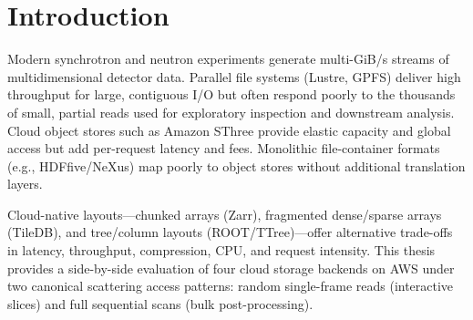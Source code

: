 \documentclass[nomenclature, english, bibtex]{kththesis}
\numberwithin{listing}{chapter}
\begin{document}
\renewcommand{\chaptermark}[1]{ \markboth{#1}{}}
\tableofcontents
 \markboth{\contentsname}{}

\cleardoublepage
\listoffigures

\cleardoublepage

\listoftables
\cleardoublepage
\cleardoublepage


\printglossary[style=mylong, type=\acronymtype, title={List of acronyms and abbreviations}]

\ifnomenclature
  \cleardoublepage
  \printnomenclature
\fi

\label{pg:lastPageofPreface}

\mainmatter
\glsresetall
\renewcommand{\chaptermark}[1]{\markboth{#1}{}}











\chapter{Introduction}
\label{ch:introduction}
Modern synchrotron and neutron experiments generate multi-GiB/s streams of multidimensional detector data. Parallel file systems (Lustre, \gls{GPFS}) deliver high throughput for large, contiguous I/O but often respond poorly to the thousands of small, partial reads used for exploratory inspection and downstream analysis. Cloud object stores such as Amazon \gls{SThree} provide elastic capacity and global access but add per-request latency and fees. Monolithic file-container formats (e.g., \gls{HDFfive}/NeXus) map poorly to object stores without additional translation layers.

Cloud-native layouts—chunked arrays (Zarr), fragmented dense/sparse arrays (TileDB), and tree/column layouts (\gls{ROOT}/\gls{TTree})—offer alternative trade-offs in latency, throughput, compression, \gls{CPU}, and request intensity. This thesis provides a side-by-side evaluation of four cloud storage backends on \gls{AWS} under two canonical scattering access patterns: random single-frame reads (interactive slices) and full sequential scans (bulk post-processing).
\end{document}
